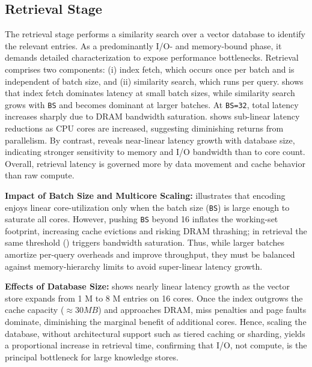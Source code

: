 \subsection{Retrieval Stage}
\label{sec:char:Retrieval}
The retrieval stage performs a similarity search over a vector database to identify the \topk relevant entries. As a predominantly I/O- and memory-bound phase, it demands detailed characterization to expose performance bottlenecks. Retrieval comprises two components: (i) index fetch, which occurs once per batch and is independent of batch size, and (ii) similarity search, which runs per query.  shows that index fetch dominates latency at small batch sizes, while similarity search grows with \texttt{BS} and becomes dominant at larger batches. At \texttt{BS=32}, total latency increases sharply due to DRAM bandwidth saturation.
 shows sub-linear latency reductions as CPU cores are increased, suggesting diminishing returns from parallelism. By contrast,  reveals near-linear latency growth with database size, indicating stronger sensitivity to memory and I/O bandwidth than to core count. Overall, retrieval latency is governed more by data movement and cache behavior than raw compute.



\noindent\textbf{Impact of Batch Size and Multicore Scaling:} 
 illustrates that encoding enjoys linear core-utilization only when the batch size (\texttt{BS}) is large enough to saturate all cores.  
However, pushing \texttt{BS} beyond 16 inflates the working-set footprint, increasing cache evictions and risking DRAM thrashing; in retrieval the same threshold () triggers bandwidth saturation.  
Thus, while larger batches amortize per-query overheads and improve throughput, they must be balanced against memory-hierarchy limits to avoid super-linear latency growth.

\noindent\textbf{Effects of Database Size:} 
 shows nearly linear latency growth as the vector store expands from 1 M to 8 M entries on 16 cores.  Once the index outgrows the cache capacity ($\approx30 MB$) and approaches DRAM, miss penalties and page faults dominate, diminishing the marginal benefit of additional cores.  Hence, scaling the database, without architectural support such as tiered caching or sharding, yields a proportional increase in retrieval time, confirming that I/O, not compute, is the principal bottleneck for large knowledge stores.


